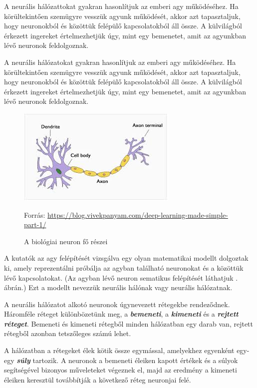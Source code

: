 
A neurális hálózattokat \cite{neuralis77} gyakran hasonlítjuk az emberi agy működéséhez. Ha körültekintően szemügyre vesszük agyunk működését, akkor azt tapasztaljuk, hogy neuronokból és közöttük felépülő kapcsolatokból áll össze. A külvilágból érkezett ingereket értelmezhetjük úgy, mint egy bemenetet, amit az agyunkban lévő neuronok feldolgoznak.

A neurális hálózatokat gyakran hasonlítjuk az emberi agy működéséhez. Ha körültekintően szemügyre vesszük agyunk működését, akkor azt tapasztaljuk, hogy neuronokból és közöttük felépülő kapcsolatokból áll össze. A külvilágból érkezett ingereket értelmezhetjük úgy, mint egy bemenetet, amit az agyunkban lévő neuronok feldolgoznak.

\begin{figure}[h]
	\centering
	\includegraphics[scale=1.0]{images/neuron.png}
	\caption{A biológiai neuron fő részei}
	\label{fig:neuron}
	Forrás: \url{https://blog.vivekpanyam.com/deep-learning-made-simple-part-1/}
\end{figure}

A kutatók az agy felépítését vizsgálva egy olyan matematikai modellt dolgoztak ki, amely   reprezentálni próbálja az agyban található neuronokat  és a közöttük lévő kapcsolatokat. (Az agyban lévő neuron sematikus felépítését láthatjuk . ábrán.) Ezt a modellt nevezzük neurális hálónak vagy neurális hálózatnak.

A neurális hálózatot alkotó neuronok úgynevezett rétegekbe rendeződnek. Háromféle réteget különbözetünk meg, a \textbf{\textit{bemeneti}}, a \textbf{\textit{kimeneti}} és a \textbf{\textit{rejtett réteget}}. Bemeneti és kimeneti rétegből minden hálózatban egy darab van, rejtett rétegből azonban tetszőleges számú lehet.

A hálózatban a rétegeket élek kötik össze egymással, amelyekhez egyenként egy-egy \textbf{\textit{súly}} tartozik. A neuronok a bemeneti éleiken kapott értékek és a súlyok segítségével bizonyos műveleteket végeznek el, majd az eredmény a kimeneti éleiken keresztül továbbítják a következő réteg neuronjai felé.

